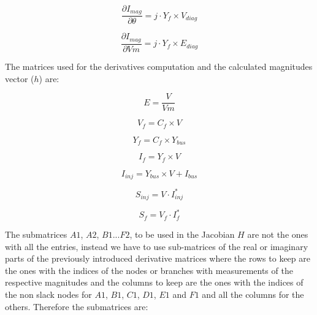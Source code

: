 \documentclass[nols,a4paper,twoside,notoc,fleqn]{tufte-book}
\begin{document}

\begin{equation}\frac{\partial I_{mag}}{\partial \theta} = j \cdot Y_f \times V_{diag} 
\end{equation}

\begin{equation}\frac{\partial I_{mag}}{\partial Vm}=j \cdot Y_f \times E_{diag} 
\end{equation}

The matrices used for the derivatives computation and the calculated magnitudes vector ($h$) are:

\begin{equation}E=\frac{V}{Vm}\end{equation}  

\begin{equation}
V_f = C_f \times V
\label{eq:voltage_from}
\end{equation}

\begin{equation}
Y_f = C_f \times Y_{bus} 
\label{eq:admittace_from}
\end{equation}

\begin{equation}
I_f = Y_f \times V 
\label{eq:current_from}
\end{equation}

\begin{equation}
I_{inj} = Y_{bus}  \times  V + I_{bus}
\label{eq:current_inj}
\end{equation}

\begin{equation}
S_{inj} = V  \cdot  I_{inj}^*
\label{eq:power_injection}
\end{equation}

\begin{equation}
S_f = V_{f} \cdot I_{f}^*
\label{eq:power_from}
\end{equation}

The submatrices $A1$, $A2$, $B1$...$F2$, to be used in the Jacobian $H$ are not the ones with all the entries, instead we have to use sub-matrices of the real or imaginary parts of the previously introduced derivative matrices where the rows to keep are the ones with the indices of the nodes or branches with measurements of the respective magnitudes and the columns to keep are the ones with the indices of the non slack nodes for $A1$, $B1$, $C1$, $D1$, $E1$ and $F1$ and all the columns for the others. Therefore the submatrices are:
\end{document}
